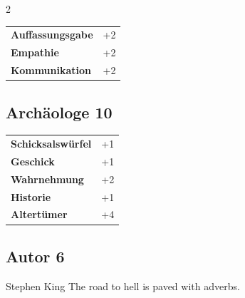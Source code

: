 \begin{multicols}{2}
\begin{tcolorbox}
\begin{tabular}{@{}ll@{}}
    \textbf{Auffassungsgabe} & +2\\
    \textbf{Empathie} & +2\\
    \textbf{Kommunikation} & +2\\
\end{tabular}


\end{tcolorbox}

\begin{tcolorbox}
    \subsection*{Archäologe \hfill \small{10 }}
    \tcblower




\begin{tabular}{@{}ll@{}}
    \textbf{Schicksalswürfel} & +1\\
    \textbf{Geschick} & +1\\
    \textbf{Wahrnehmung} & +2\\
    \textbf{Historie} & +1\\
    \textbf{Altertümer} & +4\\
\end{tabular}


\end{tcolorbox}

\begin{tcolorbox}
    \subsection*{Autor \hfill \small{6 }}
    \tcblower


\begin{pquote}{Stephen King}
The road to hell is paved with adverbs.
\end{pquote}

\vspace{3mm}


\end{tcolorbox}
\end{multicols}
